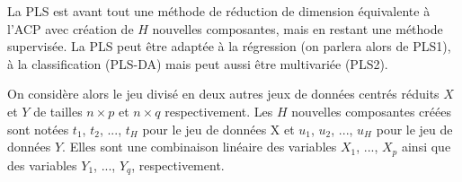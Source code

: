 \documentclass{article}
\begin{document}


La PLS est avant tout une méthode de réduction de dimension équivalente à l'ACP avec création de $H$ nouvelles composantes, mais en restant une méthode supervisée. La PLS peut être adaptée à la régression (on parlera alors de PLS1), à la classification (PLS-DA) mais peut aussi être multivariée (PLS2).


On considère alors le jeu divisé en deux autres jeux de données centrés réduits $X$ et $Y$ de tailles $n \times p$ et $n \times q$ respectivement. Les $H$ nouvelles composantes créées sont notées $t_1$, $t_2$, ..., $t_H$ pour le jeu de données X et $u_1$, $u_2$, ..., $u_H$ pour le jeu de données $Y$. Elles sont une combinaison linéaire des variables $X_1$, ..., $X_p$ ainsi que des variables $Y_1$, ..., $Y_q$, respectivement.
\end{document}
